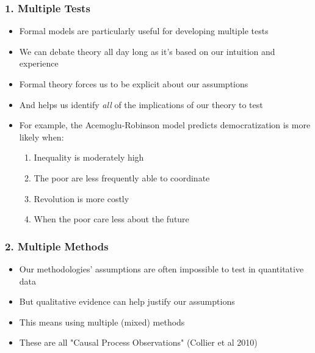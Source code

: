\documentclass[xcolor=x11names,compress]{beamer}\usepackage[]{graphicx}\usepackage[]{xcolor}
\renewcommand{\(}{\begin{columns}}
\renewcommand{\)}{\end{columns}}
\newcommand{\<}[1]{\begin{column}{#1}}
\renewcommand{\>}{\end{column}}
\begin{document}
\begin{frame}
\frametitle{1. Multiple Tests}
\begin{itemize}
\item Formal models are particularly useful for developing multiple tests
\pause
\item We can debate theory all day long as it's based on our intuition and experience
\pause
\item Formal theory forces us to be explicit about our assumptions
\pause
\item And helps us identify \textit{all} of the implications of our theory to test
\pause
\item For example, the Acemoglu-Robinson model predicts democratization is more likely when:
\begin{enumerate}
\item Inequality is moderately high
\pause
\item The poor are less frequently able to coordinate
\pause
\item Revolution is more costly
\pause
\item When the poor care less about the future
\end{enumerate}
\end{itemize}
\end{frame}

\begin{frame}
\frametitle{2. Multiple Methods}
\begin{itemize}
\item Our methodologies' assumptions are often impossible to test in quantitative data
\pause
\item But qualitative evidence can help justify our assumptions
\pause
\item This means using multiple (mixed) methods
\pause
\item These are all "Causal Process Observations" (Collier et al 2010)
\end{itemize}
\end{frame}
\end{document}
